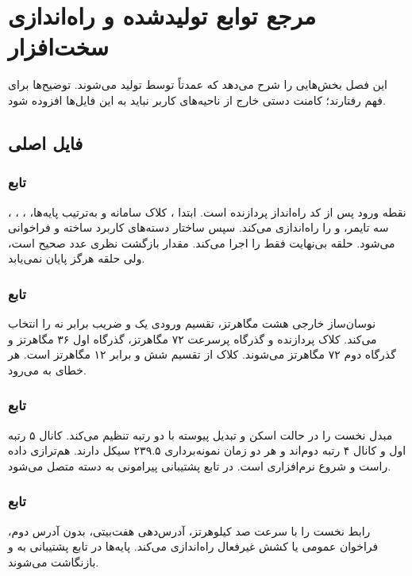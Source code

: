 \chapter{مرجع توابع تولیدشده و راه‌اندازی سخت‌افزار}

این فصل بخش‌هایی را شرح می‌دهد که عمدتاً توسط
تولید می‌شوند. توضیح‌ها برای فهم رفتارند؛ کامنت دستی خارج از ناحیه‌های کاربر نباید به این فایل‌ها افزوده شود.

\section{فایل اصلی}

\subsection{تابع }
نقطه ورود پس از کد راه‌انداز پردازنده است. ابتدا
،
کلاک سامانه و به‌ترتیب پایه‌ها،
،
،
،
سه تایمر،
و
را راه‌اندازی می‌کند. سپس ساختار دسته‌های کاربرد ساخته و
فراخوانی می‌شود. حلقه بی‌نهایت فقط
را اجرا می‌کند. مقدار بازگشت نظری عدد صحیح است، ولی حلقه هرگز پایان نمی‌یابد.

\subsection{تابع }
نوسان‌ساز خارجی هشت مگاهرتز، تقسیم ورودی یک و ضریب
برابر نه را انتخاب می‌کند. کلاک پردازنده و گذرگاه پرسرعت ۷۲ مگاهرتز، گذرگاه اول ۳۶ مگاهرتز و گذرگاه دوم ۷۲ مگاهرتز می‌شوند. کلاک
از تقسیم شش و برابر ۱۲ مگاهرتز است. هر خطای
به
می‌رود.

\subsection{تابع }
مبدل نخست را در حالت اسکن و تبدیل پیوسته با دو رتبه تنظیم می‌کند. کانال ۵ رتبه اول و کانال ۴ رتبه دوم‌اند و هر دو زمان نمونه‌برداری ۲۳۹.۵ سیکل دارند. هم‌ترازی داده راست و شروع نرم‌افزاری است.
در تابع پشتیبانی پیرامونی به دسته متصل می‌شود.

\subsection{تابع }
رابط نخست را با سرعت صد کیلوهرتز، آدرس‌دهی هفت‌بیتی، بدون آدرس دوم، فراخوان عمومی یا کشش غیرفعال راه‌اندازی می‌کند. پایه‌ها در تابع پشتیبانی به
و
بازنگاشت می‌شوند.

